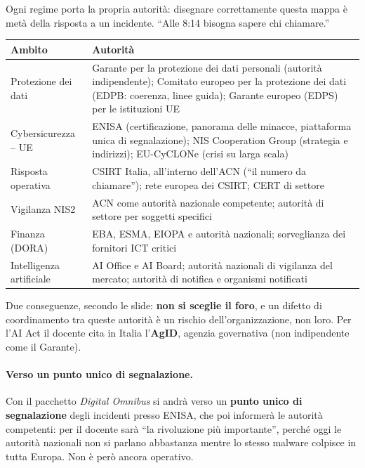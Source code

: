 Ogni regime porta la propria autorità: disegnare correttamente questa mappa è metà della risposta a un
incidente. ``Alle 8:14 bisogna sapere chi chiamare.''
\begin{center}
\small
\begin{tabularx}{\linewidth}{>{\raggedright\arraybackslash}p{3.2cm} X}
\toprule
\textbf{Ambito} & \textbf{Autorità}\\
\midrule
Protezione dei dati & Garante per la protezione dei dati personali (autorità indipendente); Comitato
  europeo per la protezione dei dati (EDPB: coerenza, linee guida); Garante europeo (EDPS) per le
  istituzioni UE\\
Cybersicurezza -- UE & ENISA (certificazione, panorama delle minacce, piattaforma unica di
  segnalazione); NIS Cooperation Group (strategia e indirizzi); EU-CyCLONe (crisi su larga scala)\\
Risposta operativa & CSIRT Italia, all'interno dell'ACN (``il numero da chiamare''); rete europea dei
  CSIRT; CERT di settore\\
Vigilanza NIS2 & ACN come autorità nazionale competente; autorità di settore per soggetti specifici\\
Finanza (DORA) & EBA, ESMA, EIOPA e autorità nazionali; sorveglianza dei fornitori ICT critici\\
Intelligenza artificiale & AI Office e AI Board; autorità nazionali di vigilanza del mercato; autorità
  di notifica e organismi notificati\\
\bottomrule
\end{tabularx}
\end{center}
Due conseguenze, secondo le slide: \textbf{non si sceglie il foro}, e un difetto di coordinamento tra
queste autorità è un rischio dell'organizzazione, non loro. Per l'AI Act il docente cita in Italia
l'\textbf{AgID}, agenzia governativa (non indipendente come il Garante).

\paragraph{Verso un punto unico di segnalazione.} Con il pacchetto \emph{Digital Omnibus} si andrà verso
un \textbf{punto unico di segnalazione} degli incidenti presso ENISA, che poi informerà le autorità
competenti: per il docente sarà ``la rivoluzione più importante'', perché oggi le autorità nazionali non
si parlano abbastanza mentre lo stesso malware colpisce in tutta Europa. Non è però ancora operativo.

